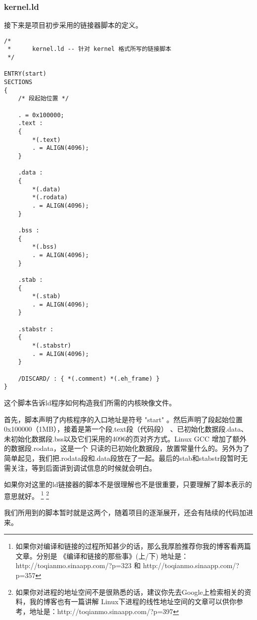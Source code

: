 \subsubsection{kernel.ld}
\par 接下来是项目初步采用的链接器脚本的定义。

\begin{lstlisting}[caption = script/kernel.ld]
/*
 *      kernel.ld -- 针对 kernel 格式所写的链接脚本
 */

ENTRY(start)
SECTIONS
{
	/* 段起始位置 */

	. = 0x100000;
	.text :
	{
		*(.text)
		. = ALIGN(4096);
	}

	.data :
	{
		*(.data)
		*(.rodata)
		. = ALIGN(4096);
	}

	.bss :
	{
		*(.bss)
		. = ALIGN(4096);
	}

	.stab :
	{
		*(.stab)
		. = ALIGN(4096);
	}
	
	.stabstr :
	{
		*(.stabstr)
	 	. = ALIGN(4096);
	}

	/DISCARD/ : { *(.comment) *(.eh_frame) }
}
\end{lstlisting}
 
\par 这个脚本告诉ld程序如何构造我们所需的内核映像文件。

\par 首先，脚本声明了内核程序的入口地址是符号 "start" 。然后声明了段起始位置0x100000（1MB），接着是第一个段.text段（代码段）\allowbreak
、已初始化数据段.data、未初始化数据段.bss以及它们采用的4096的页对齐方式。Linux GCC 增加了额外的数据段.rodata，这是一个\allowbreak
只读的已初始化数据段，放置常量什么的。另外为了简单起见，我们把.rodata段和.data段放在了一起。最后的stab和stabstr段暂时无\allowbreak
需关注，等到后面讲到调试信息的时候就会明白。

\par 如果你对这里的ld链接器的脚本不是很理解也不是很重要，只要理解了脚本表示的意思就好。
\footnote{如果你对编译和链接的过程所知甚少的话，那么我厚脸推荐你我的博客看两篇文章。分别是\allowbreak
《编译和链接的那些事》(上/下) 地址是：http://toqianmo.sinaapp.com/?p=323 和 \allowbreak
http://toqianmo.sinaapp.com/?p=357}
\footnote{如果你对进程的地址空间不是很熟悉的话，建议你先去Google上检索相关的资料，我的博客也有一篇讲解\allowbreak
Linux下进程的线性地址空间的文章可以供你参考，地址是：http://toqianmo.sinaapp.com/?p=397}

\par 我们所用到的脚本暂时就是这两个，随着项目的逐渐展开，还会有陆续的代码加进来。

